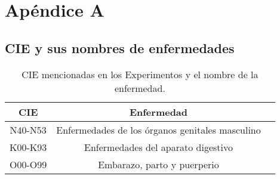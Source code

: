 \chapter{Apéndice A}

\section{CIE y sus nombres de enfermedades}
\begin{table}[H]
	{\centering
		\caption{CIE mencionadas en los Experimentos y el nombre de la enfermedad.}
		\begin{tabular}{|c|c|c|}
			\hline 
			CIE & Enfermedad\\
			\hline
			N40-N53 & Enfermedades de los órganos genitales masculino\\
			\hline
			K00-K93 & Enfermedades del aparato digestivo\\
			\hline
			O00-O99 & Embarazo, parto y puerperio\\
			\hline
		\end{tabular}
		
	\label{tab:CIE y sus nombres de enfermedades}
	}
\end{table}






